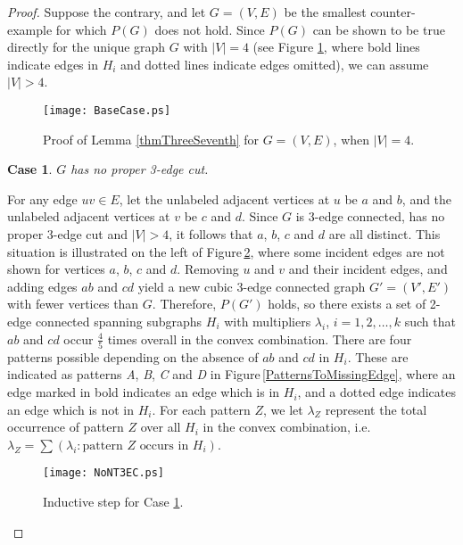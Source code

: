\documentclass[oneeqnum,final]{siamltex1213}
\newtheorem{case}{Case}
\begin{document}
\begin{proof}
Suppose the contrary, and let $G=(V, E)$ be the smallest counter-example for which $P(G)$ does not hold. Since $P(G)$ can be shown to be true directly for the unique graph $G$ with $|V| = 4$ (see Figure \ref{BaseCase}, where bold lines indicate edges in $H_{i}$ and dotted lines indicate edges omitted), we can assume $|V| > 4$.

\begin{figure}
\begin{center}
\texttt{[image: BaseCase.ps]}
\end{center}
\caption{Proof of Lemma \ref{thmThreeSeventh} for $G=(V, E)$, when $|V|=4$.}
\label{BaseCase}
\end{figure}
\vspace{1em}
\begin{case} \label{LemmaBaseCase}
$G$ has no proper 3-edge cut.
\end{case}
For any edge $uv\in E$, let the unlabeled adjacent vertices at $u$ be $a$ and $b$, and the unlabeled adjacent vertices at $v$ be $c$ and $d$. Since $G$ is 3-edge connected, has no proper 3-edge cut and $|V| > 4$, it follows that $a$, $b$, $c$ and $d$ are all distinct. This situation is illustrated on the left of Figure\,\ref{NoNonTrivial3EC}, where some incident edges are not shown for vertices $a$, $b$, $c$ and $d$. Removing $u$ and $v$ and their incident edges, and adding edges $ab$ and $cd$ yield a new cubic 3-edge connected graph $G'=(V', E')$ with fewer vertices than $G$. Therefore, $P(G')$ holds, so there exists a set of \mbox{2-edge} connected spanning subgraphs $H_{i}$ with multipliers $\lambda_{i}$, $i=1, 2, \dotsc, k$ such that $ab$ and $cd$ occur $\frac{4}{5}$ times overall in the convex combination. There are four patterns possible depending on the absence of $ab$ and $cd$ in $H_{i}$. These are indicated as patterns \emph{A}, \emph{B}, \emph{C} and \emph{D} in Figure\,\ref{PatternsToMissingEdge}, where an edge marked in bold indicates an edge which is in $H_{i}$, and a dotted edge indicates an edge which is not in $H_{i}$. For each pattern $Z$, we let $\lambda_{Z}$ represent the total occurrence of pattern $Z$ over all $H_{i}$ in the convex combination, i.e. $\lambda_{Z} = \sum(\lambda_{i}: \text{pattern }Z\text{ occurs in }H_{i})$.


\begin{figure}
\begin{center}
\texttt{[image: NoNT3EC.ps]}
\end{center}
\caption{Inductive step for Case \ref{LemmaBaseCase}.}
\label{NoNonTrivial3EC}
\end{figure}


\end{proof}
\end{document}
